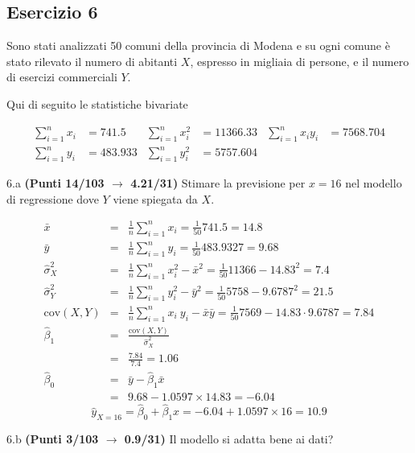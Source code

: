 \documentclass[
  11pt,
]{book}
\theoremstyle{mytheoremstyle}
\theoremstyle{mydefstyle}
\newenvironment{sol}
  {
  \begin{tcolorbox}[enhanced,breakable,arc=0.1mm,boxrule=1pt,colback=white,colframe=iblue,
  title=\bf \fontfamily{lmss}\selectfont \hspace{.5 cm} Soluzione,drop fuzzy shadow]

}{
\end{tcolorbox}
  }
\begin{document}
\subsection{Esercizio 6}\label{esercizio-6-12}

Sono stati analizzati 50 comuni della provincia di Modena e su ogni comune è stato rilevato
il numero di abitanti \(X\), espresso in migliaia di persone, e il numero di esercizi commerciali \(Y\).

Qui di seguito le statistiche bivariate

\begin{align*}
  \sum_{i=1}^n x_i &= 741.5 &\sum_{i=1}^n x_i^2 &= 11366.33 &\sum_{i=1}^n x_i y_i &= 7568.704\\
  \sum_{i=1}^n y_i &= 483.933 & \sum_{i=1}^n y_i^2 &= 5757.604 &
\end{align*}

6.a \textbf{(Punti 14/103 \(\rightarrow\) 4.21/31)} Stimare la previsione per \(x=16\) nel modello di regressione dove \(Y\) viene spiegata da \(X\).

\begin{sol}
\begin{eqnarray*}
           \bar x &=&\frac 1 n\sum_{i=1}^n x_i = \frac {1}{ 50 }  741.5 =  14.8 \\
           \bar y &=&\frac 1 n\sum_{i=1}^n y_i = \frac {1}{ 50 }  483.9327 =  9.68 \\
           \hat\sigma_X^2&=&\frac 1 n\sum_{i=1}^n x_i^2-\bar x^2=\frac {1}{ 50 }  11366  - 14.83 ^2= 7.4 \\
           \hat\sigma_Y^2&=&\frac 1 n\sum_{i=1}^n y_i^2-\bar y^2=\frac {1}{ 50 }  5758  - 9.6787 ^2= 21.5 \\
           \text{cov}(X,Y)&=&\frac 1 n\sum_{i=1}^n x_i~y_i-\bar x\bar y=\frac {1}{ 50 }  7569 - 14.83 \cdot 9.6787 = 7.84 \\
           \hat\beta_1 &=& \frac{\text{cov}(X,Y)}{\hat\sigma_X^2} \\
                    &=& \frac{ 7.84 }{ 7.4 }  =  1.06 \\
           \hat\beta_0 &=& \bar y - \hat\beta_1 \bar x\\
                    &=&  9.68 - 1.0597 \times  14.83 = -6.04 
         \end{eqnarray*}\[\hat y_{X= 16 }=\hat\beta_0+\hat\beta_1 x= -6.04 + 1.0597 \times 16 = 10.9 \]

\end{sol}

6.b \textbf{(Punti 3/103 \(\rightarrow\) 0.9/31)} Il modello si adatta bene ai dati?
\end{document}

